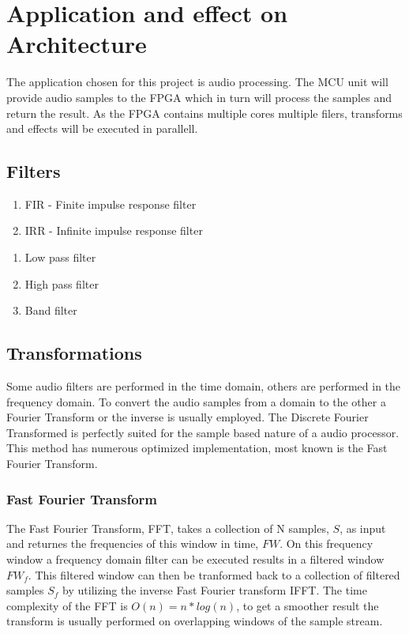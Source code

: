 \section{Application and effect on Architecture}


The application chosen for this project is audio processing. The MCU unit will provide
audio samples to the FPGA which in turn will process the samples and return the result.
As the FPGA contains multiple cores multiple filers, transforms and effects will be
executed in parallell. 

\subsection{Filters}

\begin{enumerate}
	\item FIR - Finite impulse response filter
	\item IRR - Infinite impulse response filter
\end{enumerate}

\begin{enumerate}
	\item Low pass filter
	\item High pass filter
	\item Band filter
\end{enumerate}

\subsection{Transformations}
Some audio filters are performed in the time domain, others are performed in the frequency domain. 
To convert the audio samples from a domain to the other a Fourier Transform or the inverse is usually employed.
The Discrete Fourier Transformed  is perfectly suited for the sample based nature of a audio processor. 
This method has numerous optimized implementation, most known is the Fast Fourier Transform. 

\subsubsection{Fast Fourier Transform}
The Fast Fourier Transform, FFT, takes a collection of N samples, $S$, as input and returnes the 
frequencies of this window in time, $FW$. On this frequency window a frequency domain filter 
can be executed results in a filtered window $FW_f$. This filtered window can then be tranformed
back to a collection of filtered samples $S_f$ by utilizing the inverse Fast Fourier transform IFFT.
The time complexity of the FFT is $O(n) = n*log(n)$, to get a smoother result the transform is usually performed
on overlapping windows of the sample stream. 

